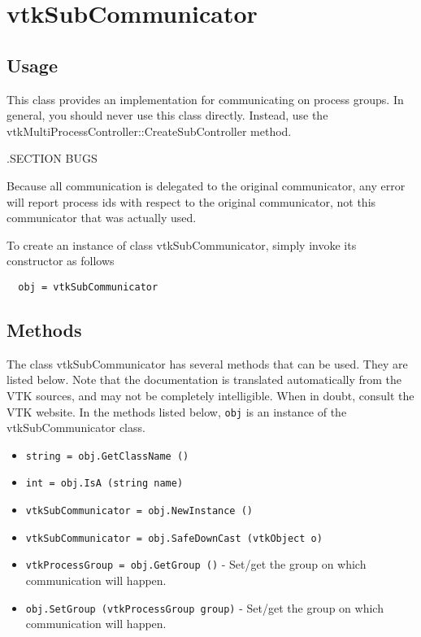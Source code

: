 \section{vtkSubCommunicator}

\subsection{Usage}


 This class provides an implementation for communicating on process groups.
 In general, you should never use this class directly.  Instead, use the
 vtkMultiProcessController::CreateSubController method.

 .SECTION BUGS

 Because all communication is delegated to the original communicator,
 any error will report process ids with respect to the original
 communicator, not this communicator that was actually used.


To create an instance of class vtkSubCommunicator, simply
invoke its constructor as follows
\begin{verbatim}
  obj = vtkSubCommunicator
\end{verbatim}
\subsection{Methods}

The class vtkSubCommunicator has several methods that can be used.
  They are listed below.
Note that the documentation is translated automatically from the VTK sources,
and may not be completely intelligible.  When in doubt, consult the VTK website.
In the methods listed below, \verb|obj| is an instance of the vtkSubCommunicator class.
\begin{itemize}
\item  \verb|string = obj.GetClassName ()|

\item  \verb|int = obj.IsA (string name)|

\item  \verb|vtkSubCommunicator = obj.NewInstance ()|

\item  \verb|vtkSubCommunicator = obj.SafeDownCast (vtkObject o)|

\item  \verb|vtkProcessGroup = obj.GetGroup ()| -  Set/get the group on which communication will happen.

\item  \verb|obj.SetGroup (vtkProcessGroup group)| -  Set/get the group on which communication will happen.

\end{itemize}
